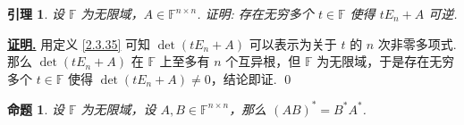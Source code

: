 \documentclass[10pt,openany]{article}
\theoremstyle{thmstyle} %
\theoremstyle{defstyle} %
\newtheorem{lemma}[theorem]{引理}
\theoremstyle{prostyle} %
\newtheorem{proposition}[theorem]{命题}
\theoremstyle{exastyle}
\theoremstyle{remstyle}
\renewenvironment{proof}[1][证明]{\par\underline{\textbf{#1.}} \;\fangsong}{\qed\par}
\newcommand{\F}{\mathbb{F}}
\newcommand{\n}{^{n \times n}}
\begin{document}
\begin{lemma} \label{2.5.17}
	设 \( \F \) 为无限域，\( A \in \F\n \). 证明: 存在无穷多个 \( t \in \F \) 使得 \( tE_n+A \) 可逆.
\end{lemma}

\begin{proof}
	用定义 \ref{2.3.35} 可知 \( \det (tE_n+A) \) 可以表示为关于 \( t \) 的 \( n \) 次非零多项式. 那么 \( \det (tE_n+A) \) 在 \( \F \) 上至多有 \( n \) 个互异根，但 \( \F \) 为无限域，于是存在无穷多个 \( t \in \F \) 使得 \( \det(tE_n+A) \neq 0 \)，结论即证.
\end{proof}

\begin{proposition} \label{2.5.18}
	设 \( \F \) 为无限域，设 \( A,B \in \F\n \)，那么 \( (AB)^*=B^*A^* \).
\end{proposition}
\end{document}
